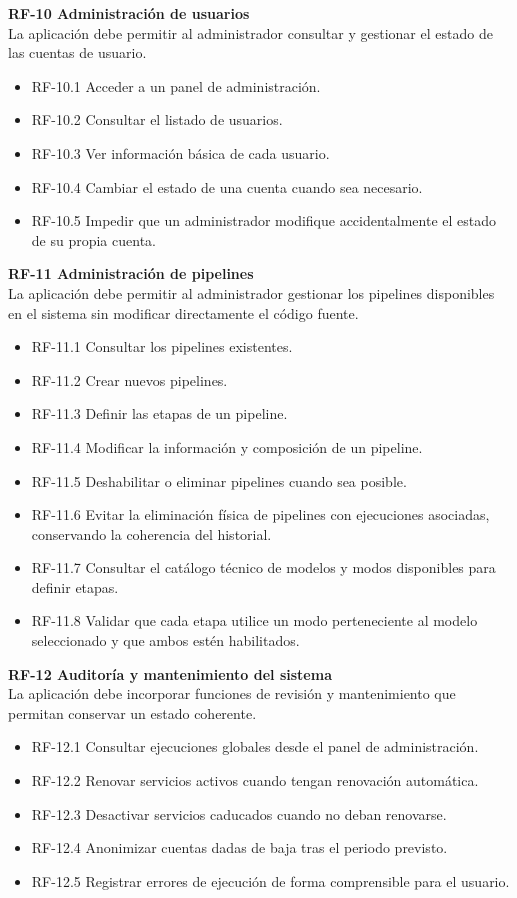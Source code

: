 \textbf{RF-10 Administración de usuarios}\\
La aplicación debe permitir al administrador consultar y gestionar el estado de las cuentas de usuario.

\begin{itemize}
	\item RF-10.1 Acceder a un panel de administración.
	\item RF-10.2 Consultar el listado de usuarios.
	\item RF-10.3 Ver información básica de cada usuario.
	\item RF-10.4 Cambiar el estado de una cuenta cuando sea necesario.
	\item RF-10.5 Impedir que un administrador modifique accidentalmente el estado de su propia cuenta.
\end{itemize}

\textbf{RF-11 Administración de pipelines}\\
La aplicación debe permitir al administrador gestionar los pipelines disponibles en el sistema sin modificar directamente el código fuente.

\begin{itemize}
	\item RF-11.1 Consultar los pipelines existentes.
	\item RF-11.2 Crear nuevos pipelines.
	\item RF-11.3 Definir las etapas de un pipeline.
	\item RF-11.4 Modificar la información y composición de un pipeline.
	\item RF-11.5 Deshabilitar o eliminar pipelines cuando sea posible.
	\item RF-11.6 Evitar la eliminación física de pipelines con ejecuciones asociadas, conservando la coherencia del historial.
	\item RF-11.7 Consultar el catálogo técnico de modelos y modos disponibles para definir etapas.
	\item RF-11.8 Validar que cada etapa utilice un modo perteneciente al modelo seleccionado y que ambos estén habilitados.
\end{itemize}

\textbf{RF-12 Auditoría y mantenimiento del sistema}\\
La aplicación debe incorporar funciones de revisión y mantenimiento que permitan conservar un estado coherente.

\begin{itemize}
	\item RF-12.1 Consultar ejecuciones globales desde el panel de administración.
	\item RF-12.2 Renovar servicios activos cuando tengan renovación automática.
	\item RF-12.3 Desactivar servicios caducados cuando no deban renovarse.
	\item RF-12.4 Anonimizar cuentas dadas de baja tras el periodo previsto.
	\item RF-12.5 Registrar errores de ejecución de forma comprensible para el usuario.
\end{itemize}

